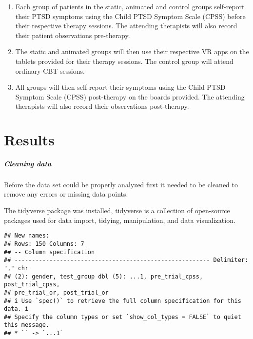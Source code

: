 \documentclass[
]{article}
\begin{document}
\begin{enumerate}
\def\labelenumi{\arabic{enumi}.}
\item
  Each group of patients in the static, animated and control groups
  self-report their PTSD symptoms using the Child PTSD Symptom Scale
  (CPSS) before their respective therapy sessions. The attending
  therapists will also record their patient observations pre-therapy.
\item
  The static and animated groups will then use their respective VR apps
  on the tablets provided for their therapy sessions. The control group
  will attend ordinary CBT sessions.
\item
  All groups will then self-report their symptoms using the Child PTSD
  Symptom Scale (CPSS) post-therapy on the boards provided. The
  attending therapists will also record their observations post-therapy.
\end{enumerate}

\hypertarget{results-1}{%
\section{Results}\label{results-1}}

\hypertarget{cleaning-data}{%
\subparagraph{\texorpdfstring{\emph{Cleaning
data}}{Cleaning data}}\label{cleaning-data}}

Before the data set could be properly analyzed first it needed to be
cleaned to remove any errors or missing data points.

The tidyverse package was installed, tidyverse is a collection of
open-source packages used for data import, tidying, manipulation, and
data visualization.

\begin{verbatim}
## New names:
## Rows: 150 Columns: 7
## -- Column specification
## -------------------------------------------------------- Delimiter: "," chr
## (2): gender, test_group dbl (5): ...1, pre_trial_cpss, post_trial_cpss,
## pre_trial_or, post_trial_or
## i Use `spec()` to retrieve the full column specification for this data. i
## Specify the column types or set `show_col_types = FALSE` to quiet this message.
## * `` -> `...1`
\end{verbatim}
\end{document}
